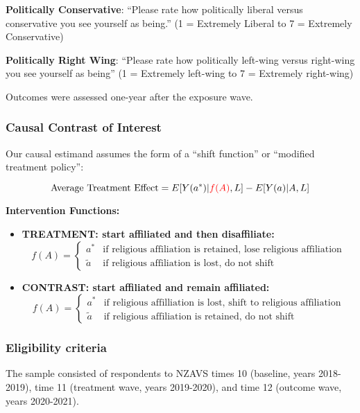 \documentclass[
  singlecolumn]{article}
\begin{document}
\textbf{Politically Conservative}: ``Please rate how politically liberal
versus conservative you see yourself as being.'' (1 = Extremely Liberal
to 7 = Extremely Conservative)

\textbf{Politically Right Wing}: ``Please rate how politically left-wing
versus right-wing you see yourself as being'' (1 = Extremely left-wing
to 7 = Extremely right-wing)

Outcomes were assessed one-year after the exposure wave.

\subsubsection{Causal Contrast of
Interest}\label{causal-contrast-of-interest}

Our causal estimand assumes the form of a ``shift function'' or
``modified treatment policy'':

\[ \text{Average Treatment Effect} = E[Y(a^*)|\textcolor{red}{f(A)},L] - E[Y(a)|A,L] \]

\textbf{Intervention Functions:}

\begin{itemize}
\item
  \textbf{TREATMENT: start affiliated and then disaffiliate:} \[
   f(A) = \begin{cases} a^* & \text{if religious affiliation is retained, lose religious affiliation} \\ 
   \tilde{a} & \text{if religious affiliation is lost, do not shift} \end{cases}
   \]
\item
  \textbf{CONTRAST: start affiliated and remain affiliated:} \[
   f(A) = \begin{cases} a^* & \text{if religious affilliation is lost, shift to religious affiliation} \\ 
   \tilde{a} & \text{if religious affiliation is retained, do not shift} \end{cases}
   \]
\end{itemize}

\subsubsection{Eligibility criteria}\label{eligibility-criteria}

The sample consisted of respondents to NZAVS times 10 (baseline, years
2018-2019), time 11 (treatment wave, years 2019-2020), and time 12
(outcome wave, years 2020-2021).
\end{document}
